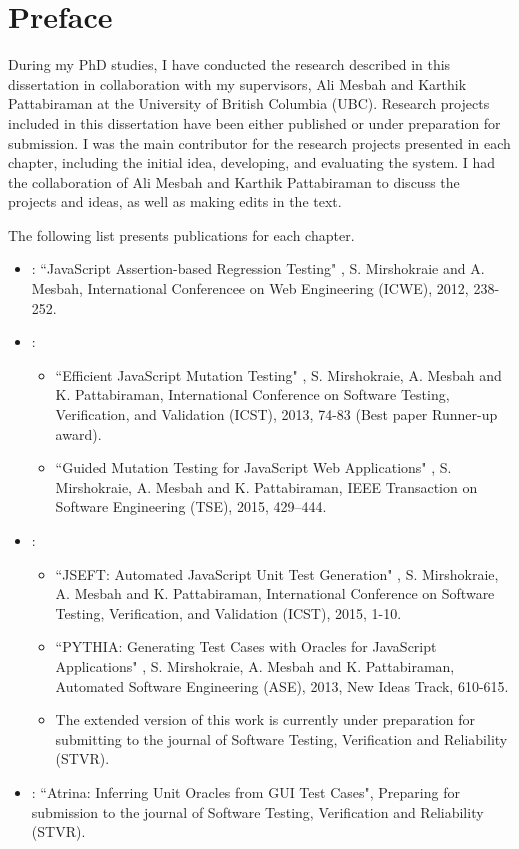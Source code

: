 
\chapter{Preface}
During my PhD studies, I have conducted the research described in this dissertation in collaboration with my supervisors, Ali Mesbah and Karthik Pattabiraman at the University of British Columbia (UBC). 
Research projects included in this dissertation have been either published or under preparation for submission. I was the main contributor for the research projects presented in each chapter, including the initial idea, developing, and evaluating the system. I had the collaboration of Ali Mesbah and Karthik Pattabiraman to discuss the projects and ideas, as well as making edits in the text. 

The following list presents publications for each chapter.
\begin{itemize}
\item {}: ``JavaScript Assertion-based Regression Testing" \cite{mirshokraie:icwe12},
S. Mirshokraie and A. Mesbah, International Conferencee on Web Engineering (ICWE), 2012, 238-252.
\item {}:
\begin{itemize}
\item ``Efficient JavaScript Mutation Testing" \cite{mirshokraie:icst13},
S. Mirshokraie, A. Mesbah and K. Pattabiraman, International Conference on Software Testing, Verification, and Validation (ICST), 2013, 74-83 (Best paper Runner-up award).
\item ``Guided Mutation Testing for JavaScript Web Applications" \cite{mirshokraie:tse15},
S. Mirshokraie, A. Mesbah and K. Pattabiraman, IEEE Transaction on Software Engineering (TSE), 2015, 429–444.
\end{itemize}
\item {}:
\begin{itemize}
\item ``JSEFT: Automated JavaScript Unit Test Generation" \cite{mirshokraie:icst15},
S. Mirshokraie, A. Mesbah and K. Pattabiraman, International Conference on Software Testing, Verification, and Validation (ICST), 2015, 1-10.
\item ``PY\-THIA: Generating Test Cases with Oracles
for JavaScript Applications" \cite{shabnam:ase13},
S. Mirshokraie, A. Mesbah and K. Pattabiraman, Automated Software Engineering (ASE), 2013, New Ideas Track, 610-615.
\item The extended version of this work is currently under preparation for submitting to the journal of Software Testing, Verification and Reliability (STVR). 
\end{itemize} 
\item {}: ``Atrina: Inferring Unit Oracles from GUI Test Cases", Preparing for submission to the journal of Software Testing, Verification and Reliability (STVR).
\end{itemize} 


